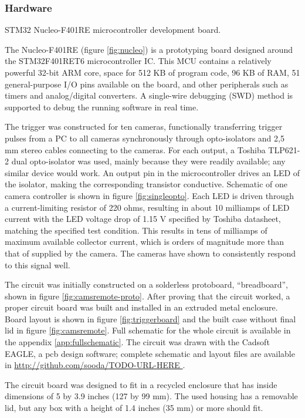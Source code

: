 \subsubsection{Hardware}

{STM32 Nucleo-F401RE microcontroller development board.}

The Nucleo-F401RE (figure \ref{fig:nucleo}) is a prototyping board designed around the STM32F401RET6 microcontroller IC.
This MCU contains a relatively powerful 32-bit ARM core, space for 512 KB of program code, 96 KB of RAM, 51 general-purpose I/O pins available on the board, and other peripherals such as timers and analog/digital converters.
A single-wire debugging (SWD) method is supported to debug the running software in real time.

The trigger was constructed for ten cameras, functionally transferring trigger pulses from a PC to all cameras synchronously through opto-isolators and 2,5 mm stereo cables connecting to the cameras.
For each output, a Toshiba TLP621-2 dual opto-isolator was used, mainly because they were readily available; any similar device would work.
An output pin in the microcontroller drives an LED of the isolator, making the corresponding transistor conductive.
Schematic of one camera controller is shown in figure \ref{fig:singleopto}.
Each LED is driven through a current-limiting resistor of 220 ohms, resulting in about 10 milliamps of LED current with the LED voltage drop of 1.15 V specified by Toshiba datasheet, matching the specified test condition.
This results in tens of milliamps of maximum available collector current, which is orders of magnitude more than that of supplied by the camera. %
The cameras have shown to consistently respond to this signal well.

The circuit was initially constructed on a solderless protoboard, ``breadboard'', shown in figure \ref{fig:camsremote-proto}.
After proving that the circuit worked, a proper circuit board was built and installed in an extruded metal enclosure.
Board layout is shown in figure \ref{fig:triggerboard} and the built case without final lid in figure \ref{fig:camsremote}.
Full schematic for the whole circuit is available in the appendix \ref{app:fullschematic}.
The circuit was drawn with the Cadsoft EAGLE, a pcb design software; complete schematic and layout files are available in \url { http://github.com/sooda/TODO-URL-HERE }.

The circuit board was designed to fit in a recycled enclosure that has inside dimensions of 5 by 3.9 inches (127 by 99 mm).
The used housing has a removable lid, but any box with a height of 1.4 inches (35 mm) or more should fit.

